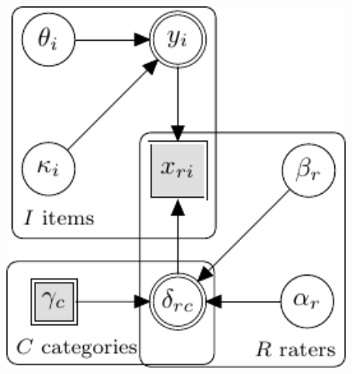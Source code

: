 \documentclass[a4paper]{article}
\begin{document}
\begin{figure}[!ht]
	\begin{minipage}{0.6\textwidth}
		\centering
		\includegraphics[width=1\textwidth, page=8]{graphicalModels/graphicalModels.pdf}
	\end{minipage}\hfill
\begin{minipage}{0.4\textwidth}
{\large
	\begin{align*}

\end{align*}}
\end{minipage}
\end{figure}
\end{document}
